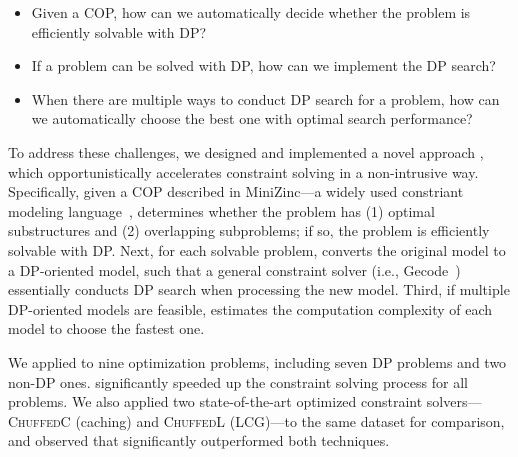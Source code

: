 \begin{itemize}
    \item Given a COP, how can we automatically decide whether the problem is efficiently solvable with DP? 
    \item If a problem can be solved with DP, how can we implement the DP search?
    \item When there are multiple ways to conduct DP search for a problem, how can we automatically choose the best one with optimal search performance? 
\end{itemize}

To address these challenges, we designed and implemented a novel approach \tool, which opportunistically accelerates constraint solving in a non-intrusive way. 
Specifically, given a COP described in MiniZinc---a widely used constriant modeling language~\cite{nethercote2007minizinc}, \tool determines  whether the problem has (1) optimal substructures and (2) overlapping subproblems; if so, the problem is efficiently solvable with DP. Next, for each solvable problem, \tool
converts the original model to a DP-oriented model, such that a general constraint solver (i.e., Gecode~\cite{schulte2006gecode}) essentially conducts DP search when processing the new model. 
Third, if multiple DP-oriented models are feasible, \tool estimates the computation complexity of each model to choose the fastest one.  

We applied \tool to nine optimization problems, 
including seven DP problems and two non-DP ones. \tool significantly speeded up the constraint solving process for all problems.  
We also applied two state-of-the-art optimized constraint solvers---\textsc{ChuffedC} (caching) and \textsc{ChuffedL} (LCG)---to the same dataset for comparison, and observed that \tool significantly outperformed both techniques. 



	
	

